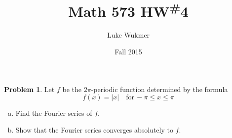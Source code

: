 \documentclass[10pt]{article}
\theoremstyle{plain}
\theoremstyle{definition}
\newtheorem{prob}{Problem}
\numberwithin{equation}{section}
\begin{document}
\title{Math 573 HW\textsuperscript{\#}4}
\author{Luke Wukmer}
\date{Fall 2015}
\maketitle \thispagestyle{empty} %
\lstset{language=Python}

\begin{prob}
    Let $f$ be the $2\pi$-periodic function determined by the formula
    \[
            f(x) = \left|{x}\right| \quad \text{for} \,   -\pi \leq x \leq \pi
    \]

\begin{enumerate}[(a)]
    \item Find the Fourier series of $f$.
    \item Show that the Fourier series converges absolutely to $f$.
\end{enumerate}
\end{prob}
\end{document}
